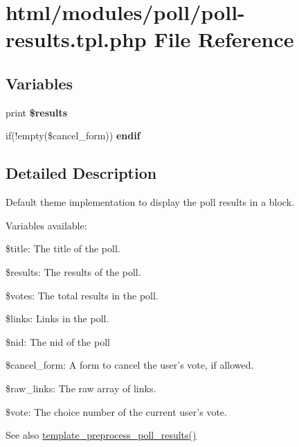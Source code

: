 \hypertarget{poll-results_8tpl_8php}{
\section{html/modules/poll/poll-\/results.tpl.php File Reference}
\label{poll-results_8tpl_8php}
}
\subsection*{Variables}
\begin{DoxyCompactItemize}
\item 
\hypertarget{poll-results_8tpl_8php_a1709ce1b840f1f71eaa65e1c07a5bffb}{
print {\bfseries \$results}}
\label{poll-results_8tpl_8php_a1709ce1b840f1f71eaa65e1c07a5bffb}

\item 
\hypertarget{poll-results_8tpl_8php_a6861e28dbca449fe2450521c19cfd1b8}{
if(!empty(\$cancel\_\-form)) {\bfseries endif}}
\label{poll-results_8tpl_8php_a6861e28dbca449fe2450521c19cfd1b8}

\end{DoxyCompactItemize}


\subsection{Detailed Description}
Default theme implementation to display the poll results in a block.

Variables available:
\begin{DoxyItemize}
\item \$title: The title of the poll.
\item \$results: The results of the poll.
\item \$votes: The total results in the poll.
\item \$links: Links in the poll.
\item \$nid: The nid of the poll
\item \$cancel\_\-form: A form to cancel the user's vote, if allowed.
\item \$raw\_\-links: The raw array of links.
\item \$vote: The choice number of the current user's vote.
\end{DoxyItemize}

\begin{DoxySeeAlso}{See also}
\hyperlink{poll_8module_a4797e0810a85deacc6dcc9bedf24d235}{template\_\-preprocess\_\-poll\_\-results()} 
\end{DoxySeeAlso}
